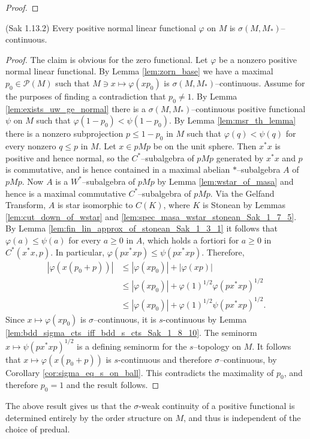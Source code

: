 \begin{proof}
\end{proof}

\begin{theorem}
  \label{thm:sigma_cts_of_normal_Sak_1_13_2} (Sak 1.13.2)
  Every positive normal linear functional $\varphi$ on $M$ is $\sigma(M,M_{*})$--continuous.
\end{theorem}

\begin{proof}
  The claim is obvious for the zero functional. Let $\varphi$ be a nonzero positive normal linear functional. By Lemma \ref{lem:zorn_base} we have
  a maximal $p_0\in \mathcal{P}(M)$ such that $M\ni x \mapsto \varphi(xp_0)$ is $\sigma(M,M_{*})$--continuous. Assume for the purposes of finding
  a contradiction that $p_0\ne 1$. By Lemma \ref{lem:exists_uw_ge_normal}
  there is a $\sigma(M,M_{*})$--continuous positive functional $\psi$ on $M$ such that $\varphi(1-p_0)<\psi(1-p_0)$. By Lemma \ref{lem:msr_th_lemma}
  there is a nonzero subprojection $p\le 1-p_0$ in $M$ such that $\varphi(q)< \psi(q)$ for every nonzero $q\le p$ in $M$. Let $x\in pMp$ be on the unit sphere.
  Then $x^{*}x$ is positive and hence normal, so the $C^{*}$--subalgebra of $pMp$ generated by $x^{*}x$ and $p$ is commutative, and is hence contained in a maximal abelian
  $*$--subalgebra $A$ of $pMp$. Now $A$ is a $W^{*}$--subalgebra of $pMp$ by Lemma \ref{lem:wstar_of_masa} and hence is a maximal commutative $C^{*}$--subalgebra of $pMp$. Via the Gelfand Transform,
  $A$ is star isomorphic to $C(K)$, where $K$ is Stonean by Lemmas \ref{lem:cut_down_of_wstar} and \ref{lem:spec_masa_wstar_stonean_Sak_1_7_5}.
  By Lemma \ref{lem:fin_lin_approx_of_stonean_Sak_1_3_1} it follows that $\varphi(a)\le \psi(a)$ for every $a\ge 0$ in $A$, which holds a fortiori for $a\ge 0$ in $C^{*}(x^{*}x,p)$.
  In particular, $\varphi(px^{*}xp)\le \psi(px^{*}xp)$. Therefore,
  \begin{align}
    |\varphi(x(p_0+p))|&\le |\varphi(xp_0)|+|\varphi(xp)|\\ \nonumber
    &\le |\varphi(xp_0)|+\varphi(1)^{1/2}\varphi(px^{*}xp)^{1/2}\\ \nonumber
    &\le |\varphi(xp_0)|+\varphi(1)^{1/2}\psi(px^{*}xp)^{1/2}.
  \end{align}
  Since $x\mapsto \varphi(xp_0)$ is $\sigma$--continuous, it is $s$-continuous by Lemma \ref{lem:bdd_sigma_cts_iff_bdd_s_cts_Sak_1_8_10}. The seminorm
  $x \mapsto \psi(px^{*}xp)^{1/2}$ is a defining seminorm for the $s$--topology on $M$. It follows that $x\mapsto \varphi(x(p_0+p))$ is $s$-continuous
  and therefore $\sigma$--continuous, by Corollary \ref{cor:sigma_eq_s_on_ball}. This contradicts the maximality of $p_0$, and therefore $p_0=1$ and the result follows.
\end{proof}

The above result gives us that the $\sigma$-weak continuity of a positive functional is determined entirely by the order structure on $M$,
and thus is independent of the choice of predual.
